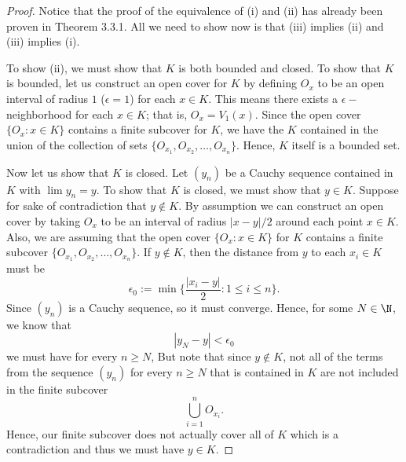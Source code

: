 \begin{proof}
Notice that the proof of the equivalence of (i) and (ii) has already been proven in Theorem 3.3.1. All we need to show now is that (iii) implies (ii) and (iii) implies (i). 

To show (ii), we must show that \( K \) is both bounded and closed. To show that \( K \) is bounded, let us construct an open cover for \( K \) by defining \( O_x  \) to be an open interval of radius \( 1 \) (\( \epsilon  = 1  \)) for each \( x \in K \). This means there exists a \( \epsilon - \)neighborhood for each \( x \in K \); that is, \( O_x = V_1(x) \). Since the open cover \( \{ O_x : x \in K \}  \) contains a finite subcover for \( K \), we have the \( K \) contained in the union of the collection of sets \( \{ O_{x_1}, O_{x_2}, \dots , O_{x_n} \}  \). Hence, \( K \) itself is a bounded set.

Now let us show that \( K \) is closed. Let \( (y_n) \) be a Cauchy sequence contained in \( K \) with \( \lim y_n = y  \). To show that \( K \) is closed, we must show that \( y \in K \). Suppose for sake of contradiction that \( y \notin K  \). By assumption we can construct an open cover by taking \( O_x  \) to be an interval of radius \( | x - y  | / 2  \) around each point \( x \in K \). Also, we are assuming that the open cover \( \{ O_x : x \in K \}  \) for \( K \) contains a finite subcover \( \{ O_{x_1}, O_{x_2}, \dots, O_{x_n} \}  \). If \( y \notin K \), then the distance from \( y \) to each \( x_i \in K \) must be 
\[ \epsilon_0 := \min \Big\{ \frac{ | x_i - y  |  }{ 2  }   : 1 \leq i \leq n \Big\}.\]
Since \( (y_n) \) is a Cauchy sequence, so it must converge. Hence, for some \( N \in \N \), we know that 
\[ | y_N - y  | < \epsilon_0 \] we must have for every \( n \geq N \), 
But note that since \( y \notin K  \), not all of the terms from the sequence \( (y_n) \) for every \( n \geq N \) that is contained in \( K \) are not included in the finite subcover
\[ \bigcup_{ i=1 }^{ n } O_{x_i}. \]
Hence, our finite subcover does not actually cover all of \( K \) which is a contradiction and thus we must have \( y \in K \).
\end{proof}



